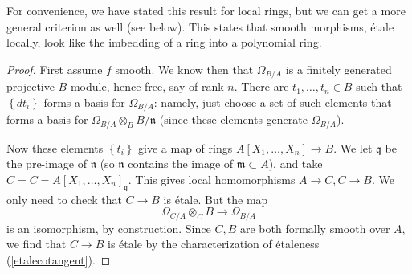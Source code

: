 For convenience, we have stated this result for local rings, but we can get a
more general criterion as well (see below). This states that smooth
morphisms, \'etale locally, look like the imbedding of a ring into a
polynomial ring.

\begin{proof} First assume $f$ smooth.
We know then that $\Omega_{B/A}$ is a finitely generated projective $B$-module,
hence free, say of rank $n$. 
There are $t_1, \dots, t_n \in B$ such that $\left\{dt_i\right\}$ forms a basis
for $\Omega_{B/A}$: namely, just choose a set of such elements that forms a
basis for $\Omega_{B/A} \otimes_B B/\mathfrak{n}$ (since these elements
generate $\Omega_{B/A}$).

Now these elements $\left\{t_i\right\}$ give a map of rings $A[X_1, \dots, X_n]
\to B$. We let $\mathfrak{q}$ be the pre-image of $\mathfrak{n}$ (so
$\mathfrak{n}$ contains the image of $\mathfrak{m} \subset A$), and take $C =
C = A[X_1,\dots, X_n]_{\mathfrak{q}}$. This gives local homomorphisms $A \to C,
C \to B$. We only need to check that $C \to B$ is \'etale. 
But the map
\[ \Omega_{C/A} \otimes_C B \to \Omega_{B/A}  \]
is an isomorphism, by construction. Since $C, B$ are both formally smooth over
$A$, we find that $C \to B$ is \'etale by the characterization of \'etaleness
(\cref{etalecotangent}).

\end{proof} 




